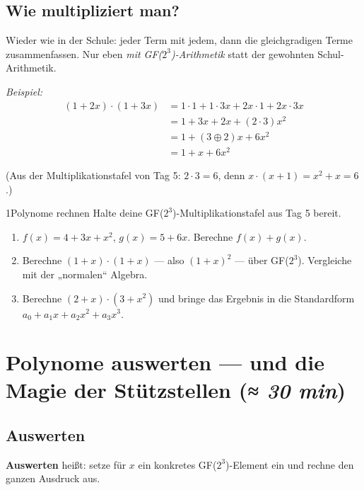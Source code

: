 \subsection*{Wie multipliziert man?}

Wieder wie in der Schule: jeder Term mit jedem, dann die
gleichgradigen Terme zusammenfassen. Nur eben \emph{mit
GF($2^3$)-Arithmetik} statt der gewohnten Schul-Arithmetik.

\textit{Beispiel:}
\begin{align*}
  (1 + 2x) \cdot (1 + 3x)
    &= 1 \cdot 1 + 1 \cdot 3x + 2x \cdot 1 + 2x \cdot 3x \\
    &= 1 + 3x + 2x + (2 \cdot 3) x^2 \\
    &= 1 + (3 \oplus 2) x + 6 x^2 \\
    &= 1 + x + 6 x^2
\end{align*}

(Aus der Multiplikationstafel von Tag 5: $2 \cdot 3 = 6$, denn
$x \cdot (x+1) = x^2 + x = 6$.)

\begin{bleistiftuebung}{1}{Polynome rechnen}
Halte deine GF($2^3$)-Multiplikationstafel aus Tag 5 bereit.

\begin{enumerate}[label=(\alph*), leftmargin=*]
\item $f(x) = 4 + 3x + x^2$, $g(x) = 5 + 6x$. Berechne $f(x) + g(x)$.
\item Berechne $(1 + x) \cdot (1 + x)$ — also $(1 + x)^2$ — über
  GF($2^3$). Vergleiche mit der „normalen“ Algebra.
\item Berechne $(2 + x) \cdot (3 + x^2)$ und bringe das Ergebnis in die
  Standardform $a_0 + a_1 x + a_2 x^2 + a_3 x^3$.
\end{enumerate}
\end{bleistiftuebung}

\section{Polynome auswerten — und die Magie der Stützstellen \normalfont(\textit{≈ 30 min})}

\subsection*{Auswerten}

\textbf{Auswerten} heißt: setze für $x$ ein konkretes
GF($2^3$)-Element ein und rechne den ganzen Ausdruck aus.

